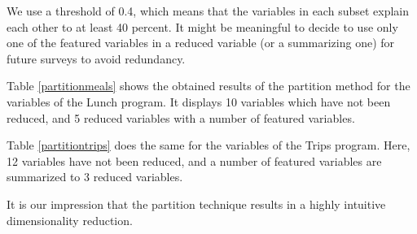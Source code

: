 \documentclass[12pt, a4paper, titlepage]{article}\usepackage[]{graphicx}\usepackage[]{color}
\begin{document}
We use a threshold of 0.4, which means that the variables in each subset explain each other to at least 40 percent. It might be meaningful to decide to use only one of the featured variables in a reduced variable (or a summarizing one) for future surveys to avoid redundancy.

Table \ref{partitionmeals} shows the obtained results of the partition method for the variables of the Lunch program. It displays 10 variables which have not been reduced, and 5 reduced variables with a number of featured variables.

Table \ref{partitiontrips} does the same for the variables of the Trips program. Here, 12 variables have not been reduced, and a number of featured variables are summarized to 3 reduced variables. 

It is our impression that the partition technique results in a highly intuitive dimensionality reduction.
\end{document}
